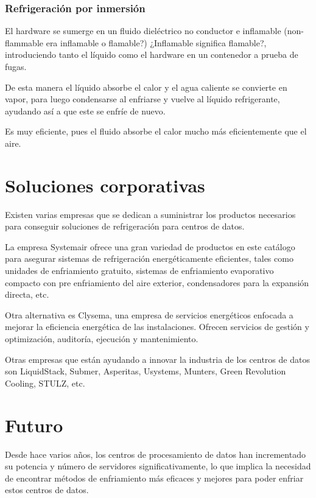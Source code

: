 \subsubsection*{Refrigeración por inmersión}

El hardware se sumerge en un fluido dieléctrico no conductor e inflamable (non-flammable era inflamable o flamable?) ¿Inflamable significa flamable?, introduciendo tanto el líquido como el hardware en un contenedor a prueba de fugas.

De esta manera el líquido absorbe el calor y el agua caliente se convierte en vapor, para luego condensarse al enfriarse y vuelve al líquido refrigerante, ayudando así a que este se enfríe de nuevo.

Es muy eficiente, pues el fluido absorbe el calor mucho más eficientemente que el aire.

\section*{Soluciones corporativas}

Existen varias empresas que se dedican a suministrar los productos necesarios para conseguir soluciones de refrigeración para centros de datos.

La empresa Systemair ofrece una gran variedad de productos en este catálogo para asegurar sistemas de refrigeración energéticamente eficientes, tales como unidades de enfriamiento gratuito, sistemas de enfriamiento evaporativo compacto con pre enfriamiento del aire exterior, condensadores para la expansión directa, etc.

Otra alternativa es Clysema, una empresa de servicios energéticos enfocada a mejorar la eficiencia energética de las instalaciones. Ofrecen servicios de gestión y optimización, auditoría, ejecución y mantenimiento.

Otras empresas que están ayudando a innovar la industria de los centros de datos son LiquidStack, Submer, Asperitas, Usystems, Munters, Green Revolution Cooling, STULZ, etc.


\section*{Futuro}

Desde hace varios años, los centros de procesamiento de datos han incrementado su potencia y número de servidores significativamente, lo que implica la necesidad de encontrar métodos de enfriamiento más eficaces y mejores para poder enfriar estos centros de datos.

